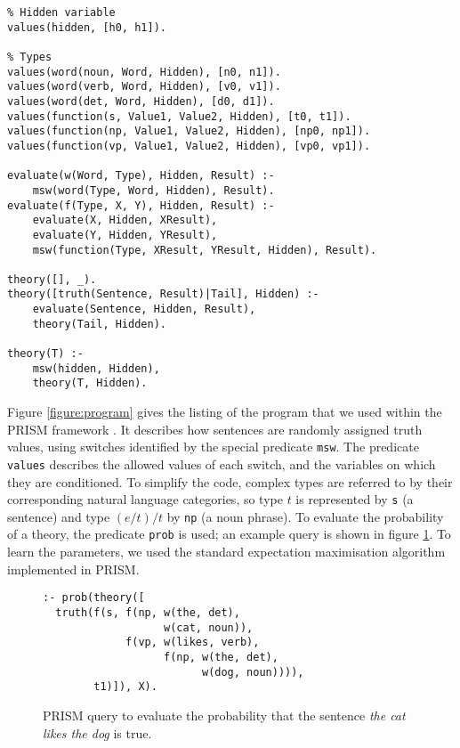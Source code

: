 \documentclass[letterpaper]{article}
\begin{document}
\begin{figure*}
\centering
\begin{lstlisting}
% Hidden variable
values(hidden, [h0, h1]).

% Types
values(word(noun, Word, Hidden), [n0, n1]).
values(word(verb, Word, Hidden), [v0, v1]).
values(word(det, Word, Hidden), [d0, d1]).
values(function(s, Value1, Value2, Hidden), [t0, t1]).
values(function(np, Value1, Value2, Hidden), [np0, np1]).
values(function(vp, Value1, Value2, Hidden), [vp0, vp1]).

evaluate(w(Word, Type), Hidden, Result) :-
	msw(word(Type, Word, Hidden), Result).
evaluate(f(Type, X, Y), Hidden, Result) :-
	evaluate(X, Hidden, XResult),
	evaluate(Y, Hidden, YResult),
	msw(function(Type, XResult, YResult, Hidden), Result).

theory([], _).
theory([truth(Sentence, Result)|Tail], Hidden) :-
	evaluate(Sentence, Hidden, Result),
	theory(Tail, Hidden).

theory(T) :-
	msw(hidden, Hidden),
	theory(T, Hidden).
\end{lstlisting}
\caption{A PRISM program describing probability distributions over
  natural language models used for our examples.}
\label{figure:program}
\end{figure*}

Figure \ref{figure:program} gives the listing of the program that we
used within the PRISM framework \cite{Sato:97}. It describes how
sentences are randomly assigned truth values, using switches
identified by the special predicate \texttt{msw}. The predicate
\texttt{values} describes the allowed values of each switch, and the
variables on which they are conditioned. To simplify the code, complex
types are referred to by their corresponding natural language
categories, so type $t$ is represented by \texttt{s} (a sentence) and
type $(e/t)/t$ by \texttt{np} (a noun phrase). To evaluate the
probability of a theory, the predicate \texttt{prob} is used; an
example query is shown in figure \ref{figure:query}. To learn the
parameters, we used the standard expectation maximisation algorithm
implemented in PRISM.

\begin{figure}
\begin{lstlisting}
:- prob(theory([
  truth(f(s, f(np, w(the, det),
                   w(cat, noun)),
             f(vp, w(likes, verb),
                   f(np, w(the, det),
                         w(dog, noun)))),
        t1)]), X).
\end{lstlisting}
\caption{PRISM query to evaluate the probability that the sentence
  \emph{the cat likes the dog} is true.}
\label{figure:query}
\end{figure}
\end{document}
